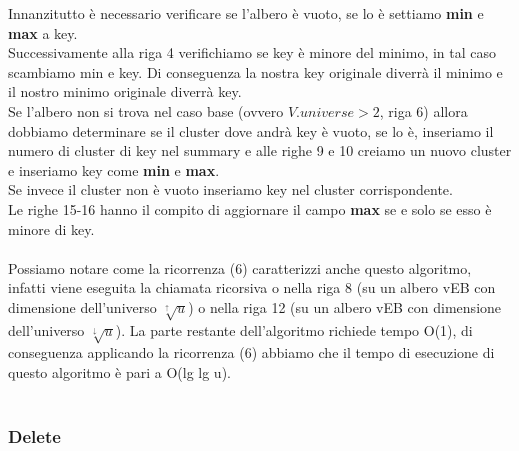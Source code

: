 \documentclass{article}
\begin{document}
            Innanzitutto è necessario verificare se l'albero è vuoto, se lo è settiamo \textbf{min} e \textbf{max} a key.\\
            Successivamente alla riga 4 verifichiamo se key è minore del minimo, in tal caso scambiamo min e key. Di conseguenza la nostra key originale diverrà il minimo e il nostro minimo originale diverrà key.\\
            Se l'albero non si trova nel caso base (ovvero $V.universe > 2$, riga 6) allora dobbiamo determinare se il cluster dove andrà key è vuoto, se lo è, inseriamo il numero di cluster di key nel summary e alle righe 9 e 10 creiamo un nuovo cluster e inseriamo key come \textbf{min} e \textbf{max}.\\
            Se invece il cluster non è vuoto inseriamo key nel cluster corrispondente.\\
            Le righe 15-16 hanno il compito di aggiornare il campo \textbf{max} se e solo se esso è minore di key.\\
            \\
            Possiamo notare come la ricorrenza (6) caratterizzi anche questo algoritmo, infatti viene eseguita la chiamata ricorsiva o nella riga 8 (su un albero vEB con dimensione dell'universo $\sqrt[\uparrow]{u}$) o nella riga 12 (su un albero vEB con dimensione dell'universo $\sqrt[\downarrow]{u}$). La parte restante dell'algoritmo richiede tempo O(1), di conseguenza applicando la ricorrenza (6) abbiamo che il tempo di esecuzione di questo algoritmo è pari a O(lg lg u).
            \\\\
            
        \subsubsection{Delete}\\
            
        
        
            
\end{document}
